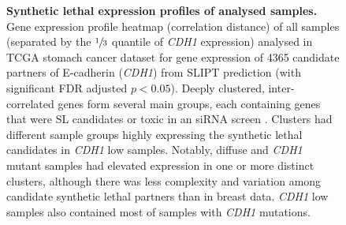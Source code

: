 \begin{figure}[!htbp]
  \centering
    \caption[Synthetic lethal expression profiles of stomach samples]{\small \textbf{Synthetic lethal expression profiles of analysed samples.} Gene expression profile heatmap (correlation distance) of all samples (separated by the $\sfrac{1}{3}$ quantile of \textit{CDH1} expression) analysed in \gls{TCGA} stomach cancer dataset for gene expression of 4365 candidate partners of \gls{E-cadherin} (\textit{CDH1}) from \gls{SLIPT} prediction (with significant \gls{FDR} adjusted $p < 0.05$). Deeply clustered, inter-correlated genes form several main groups, each containing genes that were SL candidates or toxic in an \gls{siRNA} screen \cite{Telford2015}. Clusters had different sample groups highly expressing the synthetic lethal candidates in \textit{CDH1} low samples. Notably, diffuse and \textit{CDH1} mutant samples had elevated expression in one or more distinct clusters, although there was less complexity and variation among candidate synthetic lethal partners than in breast data. \textit{CDH1} low samples also contained most of samples with \textit{CDH1} mutations.
}
\label{fig:slipt_expr_stad}
\end{figure}

